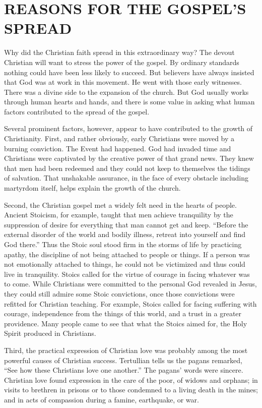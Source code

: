 \section{REASONS FOR THE GOSPEL’S SPREAD}

Why did the Christian faith spread in this extraordinary way? The devout Christian will want to
stress the power of the gospel. By ordinary standards nothing could have been less likely to
succeed. But believers have always insisted that God was at work in this movement. He went with
those early witnesses. There was a divine side to the expansion of the church. But God usually works
through human hearts and hands, and there is some value in asking what human factors contributed to
the spread of the gospel.

Several prominent factors, however, appear to have contributed to the growth of Christianity. First,
and rather obviously, early Christians were moved by a burning conviction. The Event had happened.
God had invaded time and Christians were captivated by the creative power of that grand news. They
knew that men had been redeemed and they could not keep to themselves the tidings of salvation. That
unshakable assurance, in the face of every obstacle including martyrdom itself, helps explain the
growth of the church.

Second, the Christian gospel met a widely felt need in the hearts of people. Ancient Stoicism, for
example, taught that men achieve tranquility by the suppression of desire for everything that man
cannot get and keep. “Before the external disorder of the world and bodily illness, retreat into
yourself and find God there.” Thus the Stoic soul stood firm in the storms of life by practicing
apathy, the discipline of not being attached to people or things. If a person was not emotionally
attached to things, he could not be victimized and thus could live in tranquility. Stoics called for
the virtue of courage in facing whatever was to come. While Christians were committed to the
personal God revealed in Jesus, they could still admire some Stoic convictions, once those
convictions were refitted for Christian teaching. For example, Stoics called for facing suffering
with courage, independence from the things of this world, and a trust in a greater providence. Many
people came to see that what the Stoics aimed for, the Holy Spirit produced in Christians.

Third, the practical expression of Christian love was probably among the most powerful causes of
Christian success. Tertullian tells us the pagans remarked, “See how these Christians love one
another.” The pagans’ words were sincere. Christian love found expression in the care of the poor,
of widows and orphans; in visits to brethren in prisons or to those condemned to a living death in
the mines; and in acts of compassion during a famine, earthquake, or war.


